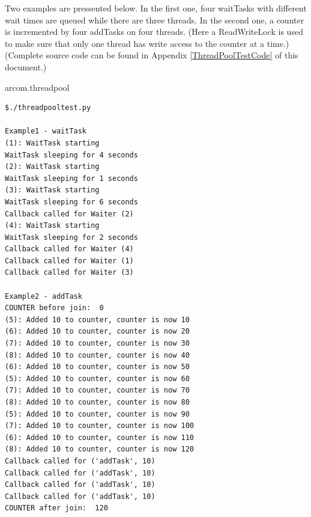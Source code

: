 \documentclass{article}
\begin{document}
\begin{flushleft}
\begin{itemize}
\end{itemize}

  Two examples are pressented below. In the first one, four waitTasks with different 
  wait times are queued while there are three threads. In the second one, a counter
  is incremented by four addTasks on four threads. (Here a ReadWriteLock is used to
  make sure that only one thread has write access to the counter at a time.)
  (Complete source code can be found in Appendix \ref{ThreadPoolTestCode} of this document.)
  \begin{example}
    \caption{arcom.threadpool}\label{arctpex}
\begin{verbatim}
$./threadpooltest.py 

Example1 - waitTask
(1): WaitTask starting
WaitTask sleeping for 4 seconds
(2): WaitTask starting
WaitTask sleeping for 1 seconds
(3): WaitTask starting
WaitTask sleeping for 6 seconds
Callback called for Waiter (2)
(4): WaitTask starting
WaitTask sleeping for 2 seconds
Callback called for Waiter (4)
Callback called for Waiter (1)
Callback called for Waiter (3)

Example2 - addTask
COUNTER before join:  0
(5): Added 10 to counter, counter is now 10
(6): Added 10 to counter, counter is now 20
(7): Added 10 to counter, counter is now 30
(8): Added 10 to counter, counter is now 40
(6): Added 10 to counter, counter is now 50
(5): Added 10 to counter, counter is now 60
(7): Added 10 to counter, counter is now 70
(8): Added 10 to counter, counter is now 80
(5): Added 10 to counter, counter is now 90
(7): Added 10 to counter, counter is now 100
(6): Added 10 to counter, counter is now 110
(8): Added 10 to counter, counter is now 120
Callback called for ('addTask', 10)
Callback called for ('addTask', 10)
Callback called for ('addTask', 10)
Callback called for ('addTask', 10)
COUNTER after join:  120
\end{verbatim}
  \end{example}

\end{flushleft}
\end{document}
